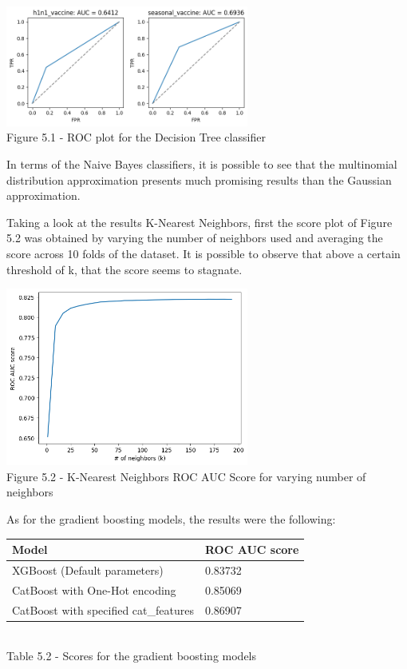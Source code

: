 \documentclass{IEEEtran}
\begin{document}
\begin{center}
    \includegraphics[width=8cm]{figures/decisionTreeROC.png}\\
    Figure 5.1 - ROC plot for the Decision Tree classifier
\end{center}

In terms of the Naive Bayes classifiers, it is possible to see that the multinomial distribution approximation presents much promising results than the Gaussian approximation.

Taking a look at the results K-Nearest Neighbors, first the score plot of Figure 5.2 was obtained by varying the number of neighbors used and averaging the score across 10 folds of the dataset. It is possible to observe that above a certain threshold of k, that the score seems to stagnate.

\begin{center}
    \includegraphics[width=8cm]{figures/KNN_score.png}\\
    Figure 5.2 - K-Nearest Neighbors ROC AUC Score for varying number of neighbors
\end{center}

As for the gradient boosting models, the results were the following:

\begin{center}
    \begin{tabular}{|l|l|}
        \hline
    \textbf{Model} & \textbf{ROC AUC score} \\ 
    \hline \hline
    XGBoost (Default parameters) & 0.83732 \\ \hline
    CatBoost with One-Hot encoding & 0.85069 \\ \hline
    CatBoost with specified cat\_features & 0.86907 \\ \hline
    \end{tabular}\\
    
    \vspace{6pt}
    Table 5.2 - Scores for the gradient boosting models
\end{center}
\end{document}
